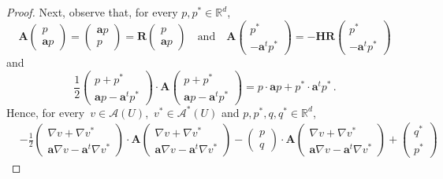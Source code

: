 \documentclass[11pt]{article} %
\numberwithin{equation}{section}
\theoremstyle{definition}
\newcommand*{\Rd}{\ensuremath{\mathbb{R}^d}}
\newcommand{\qand}{\quad \mbox{and} \quad }
\renewcommand{\a}{\mathbf{a}}
\newcommand{\A}{\mathcal{A}}
\newcommand{\bfA}{\mathbf{A}}
\newcommand{\rota}{\mathbf{R}}
\newcommand{\refl}{\mathbf{H}}
\begin{document}
\begin{proof}
Next, observe that, for every $p,p^*\in\Rd$, 
\begin{equation}
\label{e.iden.AP}
\bfA \begin{pmatrix} p   \\ \a p \end{pmatrix}
=
\begin{pmatrix} \a p   \\  p    \end{pmatrix} = \rota  \begin{pmatrix} p   \\ \a p \end{pmatrix}
\qand
\bfA \begin{pmatrix} p^*  \\  - \a^t p^* \end{pmatrix}
=
- \refl \rota \begin{pmatrix} p^*  \\  - \a^t p^* \end{pmatrix}
\end{equation}
and
\begin{equation}
\label{e.iden.eqadjeq}
\frac12  \begin{pmatrix} p + p^* \\ \a p  - \a^t p^* \end{pmatrix} \cdot \bfA \begin{pmatrix} p + p^*  \\ \a p - \a^t p^* \end{pmatrix}
=
p \cdot \a p  +p^* \cdot \a^t p^*
\,.
\end{equation}
Hence, for every~$v\in \A(U)$,~$v^*\in \A^*(U)$ and $p,p^*,q,q^*\in\Rd$, 
\begin{align}
\label{e.iden.PAP}
& 
{-}\frac12  \begin{pmatrix} \nabla v{+}\nabla v^*  
\\ \a\nabla v {-} \a^t\nabla v^*  \end{pmatrix} 
\!\cdot\!
\bfA 
\begin{pmatrix} \nabla v{+}\nabla v^*  \\ 
\a\nabla v {-} \a^t\nabla v^*  \end{pmatrix} 
\! - \!
\begin{pmatrix} p \\ q \end{pmatrix} 
\!\cdot\!
\bfA
\begin{pmatrix} \nabla v{+}\nabla v^*  \\ 
\a\nabla v {-} \a^t\nabla v^* \end{pmatrix}
\! + \!
\begin{pmatrix} q^* \\ p^* \end{pmatrix}

\end{align}
\end{proof}
\end{document}
